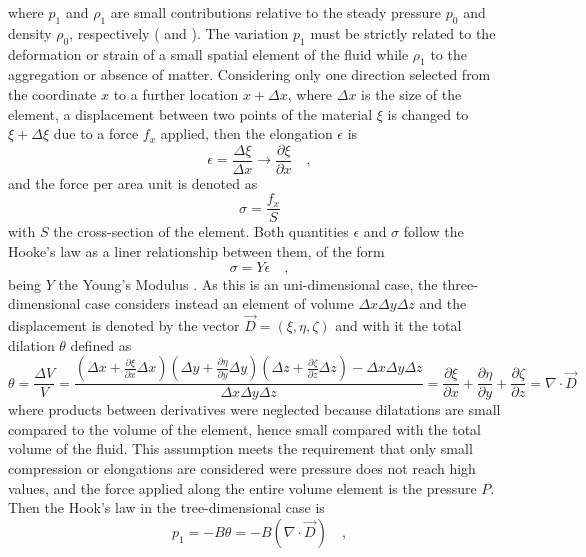 where $p_1$ and $\rho_1$ are small contributions relative to the steady pressure $p_0$ and density $\rho_0$, respectively (\cite[p.~136]{Elmore} and \cite[p.~251]{Landau}). The variation $p_1$ must be strictly related to the deformation or strain of a small spatial element of the fluid while $\rho_1$ to the aggregation or absence of matter. Considering only one direction selected from the coordinate $x$ to a further location $x + \Delta x$, where $\Delta x$ is the size of the element, a displacement between two points of the material $\xi$ is changed to $\xi+\Delta\xi$ due to a force $f_x$ applied, then the elongation $\epsilon$ is 
\begin{equation}
    \epsilon = \frac{\Delta\xi}{\Delta x}\rightarrow\frac{\partial\xi}{\partial x}\quad,
\end{equation}
and the force per area unit is denoted as 
\begin{equation}
    \sigma = \frac{f_x}{S}
\end{equation}
with $S$ the cross-section of the element. Both quantities $\epsilon$ and $\sigma$ follow the Hooke's law as a liner relationship between them, of the form
\begin{equation}
    \sigma = Y\epsilon\quad,
\end{equation}
being $Y$ the Young's Modulus \cite[p.~72]{Elmore}. As this is an uni-dimensional case, the three-dimensional case considers instead an element of volume $\Delta x\Delta y\Delta z$ and the displacement is denoted by the vector $\vec D = (\xi,\eta,\zeta)$ and with it the total dilation $\theta$ defined as 
\begin{equation}
    \theta = \frac{\Delta V}{V} = \frac{\left(\Delta x + \frac{\partial\xi}{\partial x}\Delta x\right)\left(\Delta y + \frac{\partial\eta}{\partial y}\Delta y\right)\left(\Delta 
    z + \frac{\partial\zeta}{\partial z}\Delta z\right) - \Delta x\Delta y\Delta z}{\Delta x\Delta y\Delta z} = \frac{\partial\xi}{\partial x} + \frac{\partial\eta}{\partial y} + \frac{\partial\zeta}{\partial z} = \nabla\cdot\vec D
\end{equation}
where products between derivatives were neglected because dilatations are small compared to the volume of the element, hence small compared with the total volume of the fluid. This assumption meets the requirement that only small compression or elongations are considered were pressure does not reach high values, and the force applied along the entire volume element is the pressure $P$. Then the Hook's law in the tree-dimensional case is 
\begin{equation}\label{intro.acoustics.eq:Hook_law_3D}
    p_1 = -B\theta = -B\left(\nabla\cdot\vec D\right)\quad,
\end{equation}

